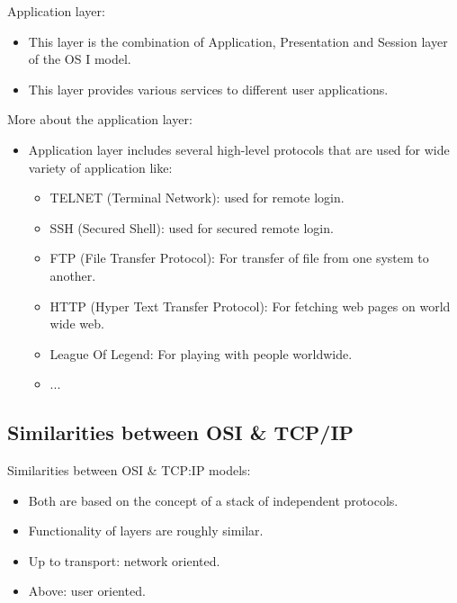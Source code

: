 \documentclass{beamer}[10pt, usepdftitle=false, handout]
\begin{document}
	\begin{frame}
	
	Application layer:
	\vspace*{1em}	
	
	\begin{itemize}
	\item{This layer is the combination of Application, Presentation and Session layer of the OS	I model.}
	\item{This layer provides various services to different user applications.}
	\end{itemize}		
	
	\end{frame}
	
	\begin{frame}
	
	More about the application layer:
	\vspace*{1em}	
	
	\begin{itemize}
	\item{Application layer includes several high-level protocols that are used for wide variety of application like: 
		\begin{itemize}
			\item{TELNET (Terminal Network): used for remote login.}
			\item{SSH (Secured Shell): used for secured remote login.}
			\item{FTP (File Transfer Protocol): For transfer of file from one system to another.}
			\item{HTTP (Hyper Text Transfer Protocol): For fetching web pages on world wide web.}	
			\item{League Of Legend: For playing with people worldwide.}
			\item{...}	
		\end{itemize}			
	
	}
	\end{itemize}		
	
	
	\end{frame}

	\subsection{Similarities between OSI \& TCP/IP}
	
	\begin{frame}

	Similarities between OSI \& TCP:IP models:
	\vspace{1em}

	\begin{itemize}
		\item{Both are based on the concept of a stack of independent protocols.}
		\item{Functionality of layers are roughly similar.}
		\item{Up to transport: network oriented.}
		\item{Above: user oriented.}
	\end{itemize}
	

	
	\end{frame}
\end{document}
